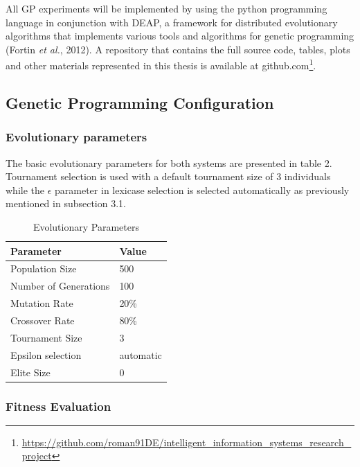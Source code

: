 \documentclass[
  12pt,
]{article}
\begin{document}
All GP experiments will be implemented by using the python programming
language in conjunction with DEAP, a framework for distributed
evolutionary algorithms that implements various tools and algorithms for
genetic programming (Fortin \emph{et al.}, 2012). A repository that
contains the full source code, tables, plots and other materials
represented in this thesis is available at github.com\footnote{\url{https://github.com/roman91DE/intelligent_information_systems_research_project}}.

\hypertarget{genetic-programming-configuration}{%
\subsection{Genetic Programming
Configuration}\label{genetic-programming-configuration}}

\hypertarget{evolutionary-parameters}{%
\subsubsection{Evolutionary parameters}\label{evolutionary-parameters}}

The basic evolutionary parameters for both systems are presented in
table 2. Tournament selection is used with a default tournament size of
\(3\) individuals while the \(\epsilon\) parameter in lexicase selection
is selected automatically as previously mentioned in subsection 3.1.

\begin{table}[!h]

\caption{\label{tab:unnamed-chunk-2}Evolutionary Parameters}
\centering
\begin{tabular}[t]{l|l}
\hline
\textbf{Parameter} & \textbf{Value}\\
\hline
Population Size & 500\\
\hline
Number of Generations & 100\\
\hline
Mutation Rate & 20\%\\
\hline
Crossover Rate & 80\%\\
\hline
Tournament Size & 3\\
\hline
Epsilon selection & automatic\\
\hline
Elite Size & 0\\
\hline
\end{tabular}
\end{table}

\hypertarget{fitness-evaluation}{%
\subsubsection{Fitness Evaluation}\label{fitness-evaluation}}
\end{document}
